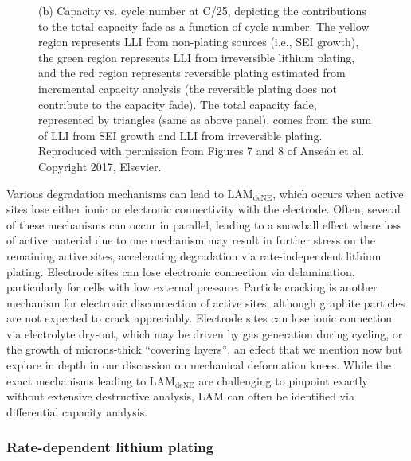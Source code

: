 \documentclass[journal=jpclcd,manuscript=article]{achemso}
\begin{document}
\begin{figure}[p]
{    (b) Capacity vs. cycle number at C/25, depicting the contributions to the total capacity fade as a function of cycle number. The yellow region represents LLI from non-plating sources (i.e., SEI growth), the green region represents LLI from irreversible lithium plating, and the red region represents reversible plating estimated from incremental capacity analysis (the reversible plating does not contribute to the capacity fade). The total capacity fade, represented by triangles (same as above panel), comes from the sum of LLI from SEI growth and LLI from irreversible plating.
    Reproduced with permission from Figures 7 and 8 of Anse\'an et al.\cite{ansean_operando_2017} Copyright 2017, Elsevier.} 
    \label{fig:thermo_plating}
\end{figure}

Various degradation mechanisms can lead to $\mathrm{LAM_{deNE}}$, which occurs when active sites lose either ionic or electronic connectivity with the electrode.
Often, several of these mechanisms can occur in parallel, leading to a snowball effect where loss of active material due to one mechanism may result in further stress on the remaining active sites, accelerating degradation via rate-independent lithium plating.
Electrode sites can lose electronic connection via delamination\cite{liu_aging_2010, cannarella_stress_2014, somerville_effect_2016, willenberg_high-precision_2020}, particularly for cells with low external pressure\cite{cannarella_stress_2014}. Particle cracking is another mechanism for electronic disconnection of active sites, although graphite particles are not expected to crack appreciably.\cite{takahashi_examination_2015}
Electrode sites can lose ionic connection via electrolyte dry-out, which may be driven by gas generation during cycling\cite{mao_calendar_2017, kupper_end--life_2018}, or the growth of microns-thick ``covering layers'', an effect that we mention now but explore in depth in our discussion on mechanical deformation knees.
While the exact mechanisms leading to $\mathrm{LAM_{deNE}}$ are challenging to pinpoint exactly without extensive destructive analysis, LAM can often be identified via differential capacity analysis.\cite{ansean_operando_2017, dubarry_durability_2018, baure_synthetic_2019, dubarry_big_2020}

\subsubsection{Rate-dependent lithium plating}
\end{document}
